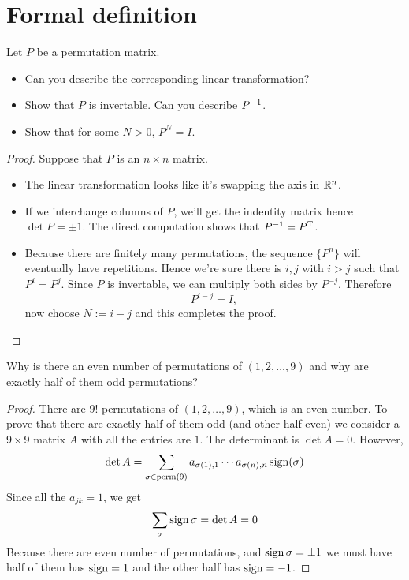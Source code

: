 \documentclass{article}
\begin{document}
\section{Formal definition}
\setcounter{exercise}{1}
\begin{exercise}
  Let $P$ be a permutation matrix.
  \begin{itemize}
    \item Can you describe the corresponding linear
      transformation?
    \item Show that $P$ is invertable. Can you describe $P^{-1}$.
    \item Show that for some $N>0$, $P^N=I$.
  \end{itemize}
\end{exercise}
\begin{proof}
  Suppose that $P$ is an $n\times n$ matrix.
  \begin{itemize}
    \item The linear transformation looks like it's swapping 
      the axis in $\R^n$.
    \item If we interchange columns of $P$, we'll get the indentity
      matrix hence $\det P=\pm 1$. The direct computation shows that
      $P^{-1} =P^\mathrm{T}$.
    \item Because there are finitely many permutations, the sequence
      $\{P^n\}$ will eventually have repetitions. Hence we're sure 
      there is $i,j$ with $i>j$ such that $P^i=P^j$. Since $P$ is 
      invertable, we can multiply both sides by $P^{-j}$. Therefore
      \[P^{i-j}=I,\]
      now choose $N:=i-j$ and this completes the proof.
  \end{itemize}
\end{proof}
\begin{exercise}
  Why is there an even number of permutations of $(1,2,\dots,9)$
  and why are exactly half of them odd permutations?
\end{exercise}
\begin{proof}
  There are $9!$ permutations of $(1,2,\dots,9)$, which is an even 
  number. To prove that there are exactly half of them odd 
  (and other half even) we consider a $9\times 9$ matrix $A$ with all 
  the entries are $1$. The determinant is $\det A=0$. However,
  \[
    \det A=\sum_{\sigma\in\operatorname{perm}(9)}
    a_{\sigma(1),1}\cdots a_{\sigma(n),n}\operatorname{sign}(\sigma)
  \]
  Since all the $a_{jk}=1$, we get 
  \[\sum_{\sigma}\operatorname{sign}\sigma=\det A=0\]
  Because there are even number of permutations, and
  $\operatorname{sign}\sigma=\pm 1$ we must have half of them has $\operatorname{sign}=1$ and
  the other half has $\operatorname{sign}=-1$.
\end{proof}
\end{document}
